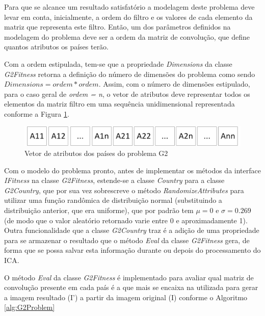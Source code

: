 Para que se alcance um resultado satisfatório a modelagem deste problema deve levar em conta, inicialmente, a ordem do filtro e os valores de cada elemento da matriz que representa este filtro. Então, um dos parâmetros definidos na modelagem do problema deve ser a ordem da matriz de convolução, que define quantos atributos os países terão.

Com a ordem estipulada, tem-se que a propriedade \emph{Dimensions} da classe \emph{G2Fitness} retorna a definição do número de dimensões do problema como sendo \(Dimensions = ordem * ordem\). Assim, com o número de dimensões estipulado, para o caso geral de \emph{ordem = n}, o vetor de atributos deve representar todos os elementos da matriz filtro em uma sequência unidimensional representada conforme a Figura \ref{fig:Problems-G2Vector}.

\begin{figure}[h]
	\centering
	\includegraphics[scale=0.8]{Figuras/Problems-G2Vector.png}
	\caption{Vetor de atributos dos países do problema G2}
	\label{fig:Problems-G2Vector}
\end{figure}

Com o modelo do problema pronto, antes de implementar os métodos da interface \emph{IFitness} na classe \emph{G2Fitness}, estende-se a classe \emph{Country} para a classe \emph{G2Country}, que por sua vez sobrescreve o método \emph{RandomizeAttributes} para utilizar uma função randômica de distribuição normal (substituindo a distribuição anterior, que era uniforme), que por padrão tem \(\mu = 0\) e \(\sigma = 0.269\) (de modo que o valor aleatório retornado varie entre 0 e aproximadamente 1). Outra funcionalidade que a classe \emph{G2Country}  traz é a adição de uma propriedade para se armazenar o resultado que o método \emph{Eval} da classe \emph{G2Fitness} gera, de forma que se possa salvar esta informação durante ou depois do processamento do ICA.

O método \emph{Eval} da classe \emph{G2Fitness} é implementado para avaliar qual matriz de convolução presente em cada país é a que mais se encaixa na utilizada para gerar a imagem resultado (I') a partir da imagem original (I) conforme o Algoritmo \ref{alg:G2Problem}

